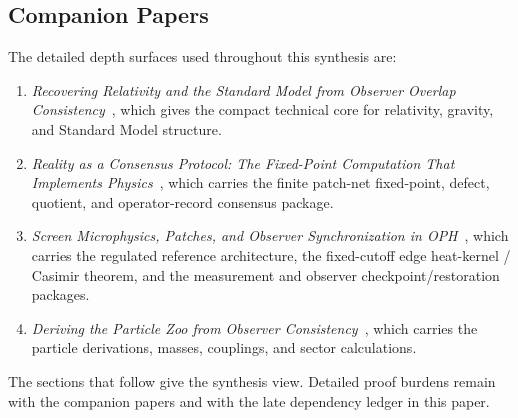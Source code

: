 \documentclass[11pt]{article}
\begin{document}
\subsection*{Companion Papers}

The detailed depth surfaces used throughout this synthesis are:
\begin{enumerate}[leftmargin=2em]
\item \emph{Recovering Relativity and the Standard Model from Observer Overlap Consistency}~\cite{ophcompact}, which gives the compact technical core for relativity, gravity, and Standard Model structure.
\item \emph{Reality as a Consensus Protocol: The Fixed-Point Computation That Implements Physics}~\cite{ophconsensus}, which carries the finite patch-net fixed-point, defect, quotient, and operator-record consensus package.
\item \emph{Screen Microphysics, Patches, and Observer Synchronization in OPH}~\cite{ophmicrophysics}, which carries the regulated reference architecture, the fixed-cutoff edge heat-kernel / Casimir theorem, and the measurement and observer checkpoint/restoration packages.
\item \emph{Deriving the Particle Zoo from Observer Consistency}~\cite{ophparticles}, which carries the particle derivations, masses, couplings, and sector calculations.
\end{enumerate}

The sections that follow give the synthesis view. Detailed proof burdens remain with the companion
papers and with the late dependency ledger in this paper.

\def\OPHSkipEmbeddedReferences{1}



\appendix


\end{document}
